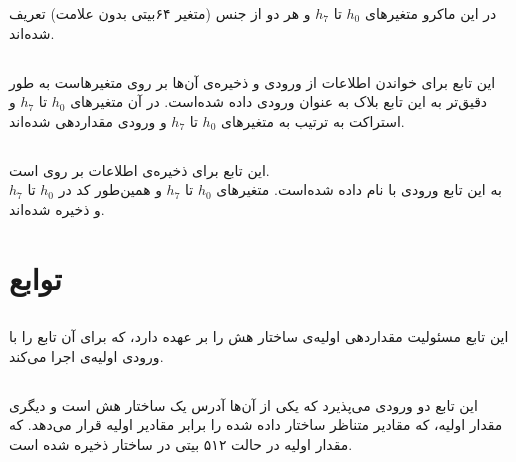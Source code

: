 در این ماکرو متغیرهای ‌$ h_0 $ تا $ h_7 $ و  هر دو از جنس (متغیر ۶۴بیتی بدون علامت) تعریف شده‌اند. 


\subsection{} 
\label{subsec:READ-STATE-BIG}


این تابع برای خواندن اطلاعات از ورودی و ذخیره‌ی ‌‌آن‌ها بر روی متغیرهاست به طور دقیق‌تر  به این تابع ‌بلاک  به عنوان ورودی داده شده‌است. در آن متغیرهای $ h_0 $ تا $ h_7 $ و  استراکت به ترتیب به متغیرهای ‌$ h_0 $ تا $ h_7 $ و  ورودی مقداردهی شده‌اند.

\subsection{} 
\label{subsec:WRITE-STATE-BIG}


این تابع برای ذخیره‌ی اطلاعات بر روی  است.\\
به این تابع ورودی   با نام  داده شده‌است. متغیرهای $ h_0 $ تا $ h_7 $ و همین‌طور  کد در $ h_0 $  تا  $ h_ 7 $ و    ذخیره شده‌اند.

\section{ توابع}

\subsection{}
\label{subsec:sph-skein512-init}
این تابع مسئولیت مقداردهی اولیه‌ی ساختار هش را بر عهده دارد، که برای آن تابع \hyperref[subsec:skein-big-init]{} را با ورودی‌ اولیه‌ی  اجرا می‌کند.
\subsection{}
\label{subsec:skein-big-init}

این تابع دو ورودی می‌پذیرد که یکی از آن‌ها آدرس یک ساختار هش است و دیگری مقدار اولیه، که مقادیر متناظر ساختار داده شده را برابر مقادیر اولیه قرار می‌دهد.
که مقدار اولیه در حالت ۵۱۲ بیتی در ساختار  ذخیره شده ‌است.

\subsection{}
\label{subsec:sph-skein512}

